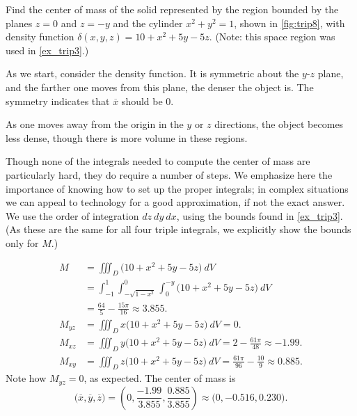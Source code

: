 \begin{example}\label{ex_trip8}
Find the center of mass of the solid represented by the region bounded by the planes $z=0$ and $z=-y$ and the cylinder $x^2+y^2=1$, shown in \autoref{fig:trip8}, with density function $\delta(x,y,z) = 10+x^2+5y-5z$. (Note: this space region was used in \autoref{ex_trip3}.)

\solution
As we start, consider the density function. It is symmetric about the $y$-$z$ plane, and the farther one moves from this plane, the denser the object is. The symmetry indicates that $\overline x$ should be 0. 

As one moves away from the origin in the $y$ or $z$ directions, the object becomes less dense, though there is more volume in these regions.  

Though none of the integrals needed to compute the center of mass are particularly hard, they do require a number of steps. We emphasize here the importance of knowing how to set up the proper integrals; in complex situations we can appeal to technology for a good approximation, if not the exact answer. We use the order of integration $dz\ dy\ dx$, using the bounds found in \autoref{ex_trip3}. (As these are the same for all four triple integrals, we explicitly show the bounds only for $M$.)

\begin{align*}
	M
	&= \iiint_D \big(10+x^2+5y-5z\big)\ dV \\
	&= \int_{-1}^1\int_{-\sqrt{1-x^2}}^0\int_0^{-y} \big(10+x^2+5y-5z\big)\ dV\\
	&= \frac{64}5-\frac{15\pi}{16} \approx 3.855.\\
	M_{yz}
	&= \iiint_D x\big(10+x^2+5y-5z\big)\ dV = 0.\\
	M_{xz}
	&= \iiint_D y\big(10+x^2+5y-5z\big)\ dV = 2-\frac{61\pi}{48}\approx -1.99.\\
	M_{xy}
	&= \iiint_D z\big(10+x^2+5y-5z\big)\ dV = \frac{61\pi}{96}-\frac{10}9\approx 0.885.
\end{align*}
Note how $M_{yz}=0$, as expected. The center of mass is
\[\big(\overline{x},\overline{y},\overline{z}\big) = \left(0,\frac{-1.99}{3.855},\frac{0.885}{3.855}\right) \approx \big(0,-0.516, 0.230\big).\]
\end{example}


